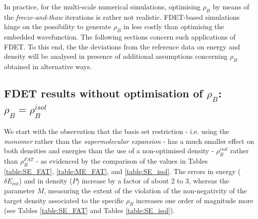 \documentclass[amsmath,amssymb,preprint,aip,jcp]{revtex4-1}
\begin{document}
In practice, for the multi-scale numerical simulations, optimising 
$\rho_B$ by means of the {\it freeze-and-thaw} iterations is rather not realistic. FDET-based simulations hinge on the possibility to generate $\rho_B$ 
in less costly than {\color{red}optimising the embedded wavefunction}. 
The following sections concern such applications of FDET. 
To this end, the the deviations from the reference data on energy and density will be analysed in presence of additional assumptions concerning $\rho_B$ obtained in alternative ways. 
\subsection{FDET results without optimisation of $\rho_B$: $\rho_B=\rho_B^{isol}$}
We start with the observation that the basis set restriction - i.e. using the {\it monomer} rather than the {\it supermolecular expansion} - has a much smaller effect on both densities and energies than the use of a non-optimised density - $\rho_B^{isol}$ rather than $\rho_B^{FAT}$ - as evidenced by the comparison of the values in Tables \ref{table:SE_FAT}, \ref{table:ME_FAT}, and \ref{table:SE_isol}.
The errors in energy ($\delta E_{int}$) and in density ($P$) increase by a factor of about 2 to 3, whereas the parameter $M$, measuring the extent of the violation of the non-negativity of the target density associated to the specific $\rho_B$ increases one order of magnitude more (see Tables \ref{table:SE_FAT} and Tables \ref{table:SE_isol}). 
\end{document}
